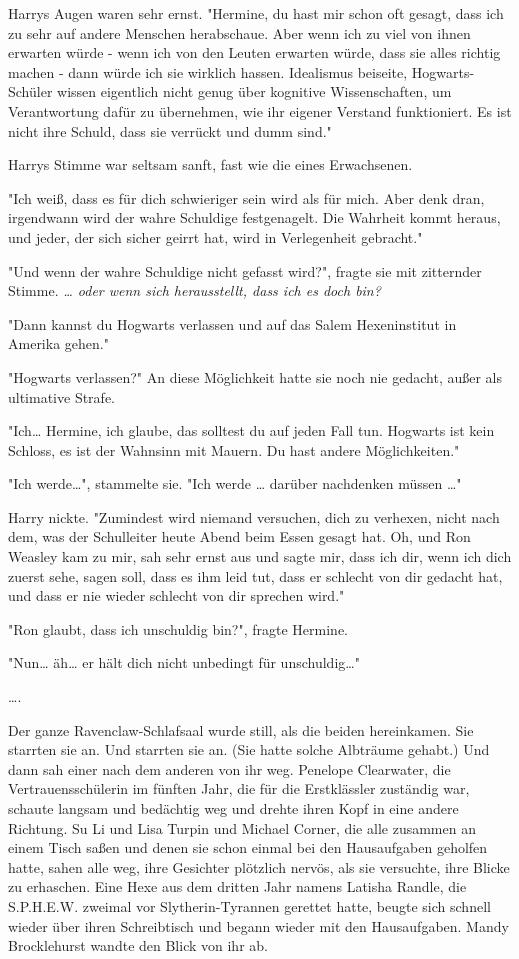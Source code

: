 {Harrys Augen waren sehr ernst. "Hermine, du hast mir schon oft gesagt, dass ich zu sehr auf andere Menschen herabschaue. Aber wenn ich zu viel von ihnen erwarten würde - wenn ich von den Leuten erwarten würde, dass sie alles richtig machen - dann würde ich sie wirklich hassen. Idealismus beiseite, Hogwarts-Schüler wissen eigentlich nicht genug über kognitive Wissenschaften, um Verantwortung dafür zu übernehmen, wie ihr eigener Verstand funktioniert. Es ist nicht ihre Schuld, dass sie verrückt und dumm sind."

Harrys Stimme war seltsam sanft, fast wie die eines Erwachsenen.

"Ich weiß, dass es für dich schwieriger sein wird als für mich. Aber denk dran, irgendwann wird der wahre Schuldige festgenagelt. Die Wahrheit kommt heraus, und jeder, der sich sicher geirrt hat, wird in Verlegenheit gebracht."

"Und wenn der wahre Schuldige nicht gefasst wird?", fragte sie mit zitternder Stimme. \emph{… oder wenn sich herausstellt, dass ich es doch bin?}

"Dann kannst du Hogwarts verlassen und auf das Salem Hexeninstitut in Amerika gehen."

"Hogwarts verlassen?" An diese Möglichkeit hatte sie noch nie gedacht, außer als ultimative Strafe.

"Ich… Hermine, ich glaube, das solltest du auf jeden Fall tun. Hogwarts ist kein Schloss, es ist der Wahnsinn mit Mauern. Du hast andere Möglichkeiten."

"Ich werde…", stammelte sie. "Ich werde … darüber nachdenken müssen …"

Harry nickte. "Zumindest wird niemand versuchen, dich zu verhexen, nicht nach dem, was der Schulleiter heute Abend beim Essen gesagt hat. Oh, und Ron Weasley kam zu mir, sah sehr ernst aus und sagte mir, dass ich dir, wenn ich dich zuerst sehe, sagen soll, dass es ihm leid tut, dass er schlecht von dir gedacht hat, und dass er nie wieder schlecht von dir sprechen wird."

"Ron glaubt, dass ich unschuldig bin?", fragte Hermine.

"Nun… äh… er hält dich nicht unbedingt für unschuldig…"

….

Der ganze Ravenclaw-Schlafsaal wurde still, als die beiden hereinkamen. Sie starrten sie an. Und starrten sie an. (Sie hatte solche Albträume gehabt.) Und dann sah einer nach dem anderen von ihr weg. Penelope Clearwater, die Vertrauensschülerin im fünften Jahr, die für die Erstklässler zuständig war, schaute langsam und bedächtig weg und drehte ihren Kopf in eine andere Richtung. Su Li und Lisa Turpin und Michael Corner, die alle zusammen an einem Tisch saßen und denen sie schon einmal bei den Hausaufgaben geholfen hatte, sahen alle weg, ihre Gesichter plötzlich nervös, als sie versuchte, ihre Blicke zu erhaschen. Eine Hexe aus dem dritten Jahr namens Latisha Randle, die S.P.H.E.W. zweimal vor Slytherin-Tyrannen gerettet hatte, beugte sich schnell wieder über ihren Schreibtisch und begann wieder mit den Hausaufgaben. Mandy Brocklehurst wandte den Blick von ihr ab.

}
